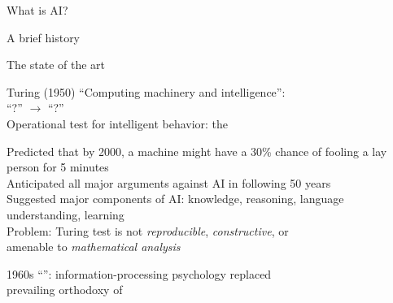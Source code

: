\documentclass{beamer}
\begin{document}
\begin{huge}

\sf


\blob What is AI?

\blob A brief history

\blob The state of the art



\vspace*{1in}

\centerline{}



Turing (1950) ``Computing machinery and intelligence'':\\
\blob ``?'' $\longrightarrow$ ``?''\\
\blob Operational test for intelligent behavior: the 

\vspace*{0.05in}

\textwidth
{}

\vspace*{-0.2in}

\blob Predicted that by 2000, a machine might have a 30\% chance of\al
     fooling a lay person for 5 minutes\\
\blob Anticipated all major arguments against AI in following 50 years\\
\blob Suggested major components of AI: knowledge, reasoning, language\al
     understanding, learning\\[0.1in]
Problem: Turing test is not \emph{reproducible}, \emph{constructive}, or\\
amenable to \emph{mathematical analysis}


1960s ``'': information-processing psychology replaced\\
prevailing orthodoxy of 


\end{huge}
\end{document}
